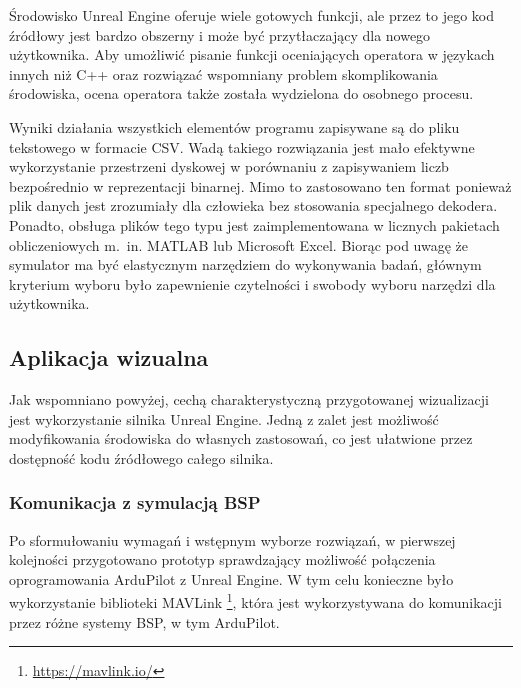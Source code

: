 Środowisko Unreal Engine oferuje wiele gotowych funkcji, ale przez to jego kod źródłowy jest bardzo obszerny i może być przytłaczający dla nowego użytkownika. Aby umożliwić pisanie funkcji oceniających operatora w językach innych niż C++ oraz rozwiązać wspomniany problem skomplikowania środowiska, ocena operatora także została wydzielona do osobnego procesu.

Wyniki działania wszystkich elementów programu zapisywane są do pliku tekstowego w formacie CSV\cite{rfc4180}. Wadą takiego rozwiązania jest mało efektywne wykorzystanie przestrzeni dyskowej w porównaniu z zapisywaniem liczb bezpośrednio w reprezentacji binarnej. Mimo to zastosowano ten format ponieważ plik danych jest zrozumiały dla człowieka bez stosowania specjalnego dekodera. Ponadto, obsługa plików tego typu jest zaimplementowana w licznych pakietach obliczeniowych m.~in. MATLAB lub Microsoft Excel. Biorąc pod uwagę że symulator ma być elastycznym narzędziem do wykonywania badań, głównym kryterium wyboru było zapewnienie czytelności i swobody wyboru narzędzi dla użytkownika.

\subsection{Aplikacja wizualna}

Jak wspomniano powyżej, cechą charakterystyczną przygotowanej wizualizacji jest wykorzystanie silnika Unreal Engine. Jedną z zalet jest możliwość modyfikowania środowiska do własnych zastosowań, co jest ułatwione przez dostępność kodu źródłowego całego silnika.

\subsubsection{Komunikacja z symulacją BSP}

Po sformułowaniu wymagań i wstępnym wyborze rozwiązań, w pierwszej kolejności przygotowano prototyp sprawdzający możliwość połączenia oprogramowania ArduPilot z Unreal Engine. W tym celu konieczne było wykorzystanie biblioteki MAVLink \footnote{\url{https://mavlink.io/}}, która jest wykorzystywana do komunikacji przez różne systemy BSP, w tym ArduPilot.

